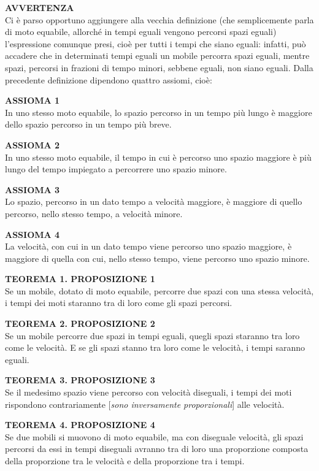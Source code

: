 \documentclass[11pt,twoside,openany]{book}
\begin{document}
\textbf{AVVERTENZA\\}Ci è parso opportuno aggiungere alla vecchia definizione (che semplicemente parla di moto equabile, allorché in tempi eguali vengono percorsi spazi eguali) l'espressione comunque presi, cioè per tutti i tempi che siano eguali: infatti, può accadere che in determinati tempi eguali un mobile percorra spazi eguali, mentre spazi, percorsi in frazioni di tempo minori, sebbene eguali, non siano eguali. Dalla precedente definizione dipendono quattro assiomi, cioè:

\textbf{ASSIOMA 1\\}In uno stesso moto equabile, lo spazio percorso in un tempo più lungo è maggiore dello spazio percorso in un tempo più breve.

\textbf{ASSIOMA 2}\\ In uno stesso moto equabile, il tempo in cui è percorso uno spazio maggiore è più lungo del tempo impiegato a percorrere uno spazio minore.

\textbf{ASSIOMA 3}\\ Lo spazio, percorso in un dato tempo a velocità maggiore, è maggiore di quello percorso, nello stesso tempo, a velocità minore.

\textbf{ASSIOMA 4}\\ La velocità, con cui in un dato tempo viene percorso uno spazio maggiore, è maggiore di quella con cui, nello stesso tempo, viene percorso uno spazio minore.

\textbf{TEOREMA 1. PROPOSIZIONE 1}\\ Se un mobile, dotato di moto equabile, percorre due spazi con una stessa velocità, i tempi dei moti staranno tra di loro come gli spazi percorsi.

\textbf{TEOREMA 2. PROPOSIZIONE 2}\\ Se un mobile percorre due spazi in tempi eguali, quegli spazi staranno tra loro come le velocità. E se gli spazi stanno tra loro come le velocità, i tempi saranno eguali.

\textbf{TEOREMA 3. PROPOSIZIONE 3}\\ Se il medesimo spazio viene percorso con velocità diseguali, i tempi dei moti rispondono contrariamente [\emph{sono inversamente proporzionali}] alle velocità.

\textbf{TEOREMA 4. PROPOSIZIONE 4}\\ Se due mobili si muovono di moto equabile, ma con diseguale velocità, gli spazi percorsi da essi in tempi diseguali avranno tra di loro una proporzione composta della proporzione tra le velocità e della proporzione tra i tempi.
\end{document}
